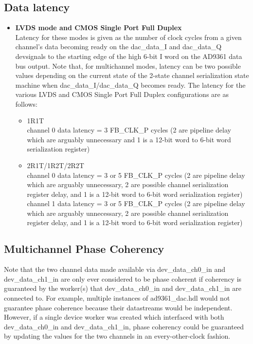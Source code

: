 \documentclass{article}
\begin{document}
\subsection*{Data latency}
\begin{itemize}
	\item{\textbf{LVDS mode and CMOS Single Port Full Duplex}} \\ Latency for these modes is given as the number of clock cycles from a given channel's data becoming ready on the dac\_data\_I and dac\_data\_Q devsignals to the starting edge of the high 6-bit I word on the AD9361 data bus output. Note that, for multichannel modes, latency can be two possible values depending on the current state of the 2-state channel serialization state machine when dac\_data\_I/dac\_data\_Q becomes ready. The latency for the various LVDS and CMOS Single Port Full Duplex configurations are as follows:
\begin{itemize}
	\item{1R1T} \\channel 0 data latency = 3 FB\_CLK\_P cycles (2 are pipeline delay which are arguably unnecessary and 1 is a 12-bit word to 6-bit word serialization register)
	\item{2R1T/1R2T/2R2T} \\channel 0 data latency = 3 or 5 FB\_CLK\_P cycles (2 are pipeline delay which are arguably unnecessary, 2 are possible channel serialization register delay, and 1 is a 12-bit word to 6-bit word serialization register) \\channel 1 data latency = 3 or 5 FB\_CLK\_P cycles (2 are pipeline delay which are arguably unnecessary, 2 are possible channel serialization register delay, and 1 is a 12-bit word to 6-bit word serialization register)
\end{itemize}
\end{itemize}
\pagebreak
\subsection*{Multichannel Phase Coherency}
Note that the two channel data made available via dev\_data\_ch0\_in and dev\_data\_ch1\_in are only ever considered to be phase coherent if coherency is guaranteed by the worker(s) that dev\_data\_ch0\_in and dev\_data\_ch1\_in are connected to. For example, multiple instances of ad9361\_dac.hdl would not guarantee phase coherence because their datastreams would be independent. However, if a single device worker was created which interfaced with both dev\_data\_ch0\_in and dev\_data\_ch1\_in, phase coherency could be guaranteed by updating the values for the two channels in an every-other-clock fashion.
\end{document}
